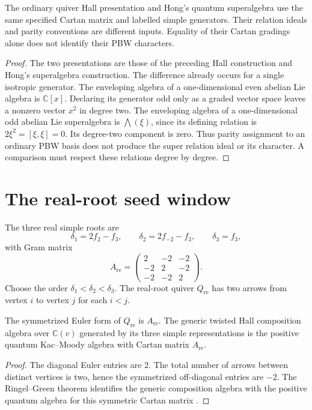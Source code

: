 \begin{theorem}
The ordinary quiver Hall presentation and Hong's quantum
superalgebra use the same specified Cartan matrix and labelled
simple generators. Their relation ideals and parity conventions
are different inputs. Equality of their Cartan gradings alone does
not identify their PBW characters.
\end{theorem}
\begin{proof}
The two presentations are those of the preceding Hall construction
and Hong's superalgebra construction. The difference already occurs
for a single isotropic generator. The enveloping algebra of a
one-dimensional even abelian Lie algebra is \(\mathbb C[x]\).
Declaring its generator odd only as a graded vector space leaves
a nonzero vector \(x^2\) in degree two. The enveloping algebra
of a one-dimensional odd abelian Lie superalgebra is
\(\bigwedge(\xi)\), since its defining relation is
\(2\xi^2=[\xi,\xi]=0\). Its degree-two component is zero.
Thus parity assignment to an ordinary PBW basis does not produce
the super relation ideal or its character. A comparison must
respect these relations degree by degree.
\end{proof}


\section{The real-root seed window}
The three real simple roots are
\[
 \delta_1=2f_2-f_3,
 \qquad
 \delta_2=2f_{-2}-f_3,
 \qquad
 \delta_3=f_3,
\]
with Gram matrix
\[
 A_{\mathrm{re}}=
 \begin{pmatrix}
 2&-2&-2\\
 -2&2&-2\\
 -2&-2&2
 \end{pmatrix}.
\]
Choose the order $\delta_1<\delta_2<\delta_3$.  The real-root quiver $Q_{\mathrm{re}}$ has two arrows from vertex $i$ to vertex $j$ for each $i<j$.

\begin{proposition}
The symmetrized Euler form of $Q_{\mathrm{re}}$ is $A_{\mathrm{re}}$.  The generic twisted Hall composition algebra over $\mathbb C(v)$
generated by its three simple representations is the positive quantum Kac--Moody algebra with Cartan matrix $A_{\mathrm{re}}$.
\end{proposition}
\begin{proof}
The diagonal Euler entries are $2$.  The total number of arrows between distinct vertices is two, hence the symmetrized off-diagonal entries are $-2$.  The Ringel--Green theorem identifies the generic composition algebra
with the positive quantum algebra for this symmetric Cartan matrix
\cite{Ringel,Green}.
\end{proof}

